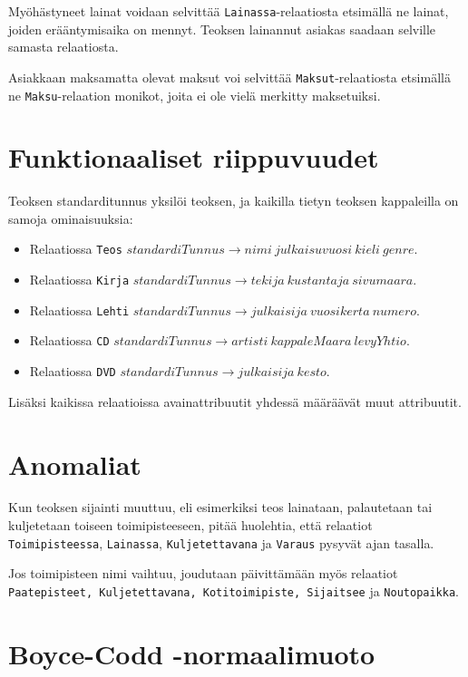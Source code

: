 \documentclass[12pt,titlepage] {article}
\begin{document}
Myöhästyneet lainat voidaan selvittää \texttt{Lainassa}-relaatiosta etsimällä ne lainat, joiden erääntymisaika on mennyt. Teoksen lainannut asiakas saadaan selville samasta relaatiosta.

Asiakkaan maksamatta olevat maksut voi selvittää \texttt{Maksut}-relaatiosta etsimällä ne \texttt{Maksu}-relaation monikot, joita ei ole vielä merkitty maksetuiksi.

\section {Funktionaaliset riippuvuudet}

Teoksen standarditunnus yksilöi teoksen, ja kaikilla tietyn teoksen kappaleilla on samoja ominaisuuksia:

\begin{itemize}
\item Relaatiossa \texttt{Teos} $standardiTunnus \rightarrow nimi\ julkaisuvuosi\ kieli\ genre$.
\item Relaatiossa \texttt{Kirja} $standardiTunnus \rightarrow tekija\ kustantaja\ sivumaara$.
\item Relaatiossa \texttt{Lehti} $standardiTunnus \rightarrow julkaisija\ vuosikerta\ numero$.
\item Relaatiossa \texttt{CD} $standardiTunnus \rightarrow artisti\ kappaleMaara\ levyYhtio$.
\item Relaatiossa \texttt{DVD} $standardiTunnus \rightarrow julkaisija\ kesto$.
\end{itemize}

Lisäksi kaikissa relaatioissa avainattribuutit yhdessä määräävät muut attribuutit.

\section {Anomaliat}

Kun teoksen sijainti muuttuu, eli esimerkiksi teos lainataan, palautetaan tai kuljetetaan toiseen toimipisteeseen, pitää huolehtia, että relaatiot \texttt{Toimipisteessa}, \texttt{Lainassa}, \texttt{Kuljetettavana} ja \texttt{Varaus} pysyvät ajan tasalla.

Jos toimipisteen nimi vaihtuu, joudutaan päivittämään myös relaatiot \texttt{Paatepisteet, Kuljetettavana, Kotitoimipiste, Sijaitsee} ja \texttt{Noutopaikka}.

\section {Boyce-Codd -normaalimuoto}
\end{document}
